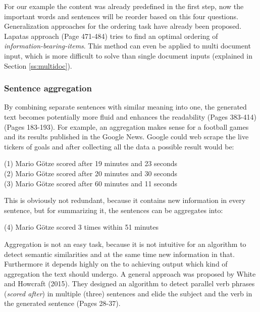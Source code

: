 For our example the content was already predefined in the first step, now the important words and sentences will be reorder based on this four questions. Generalization approaches for the ordering task have already been proposed. Lapatas approach \cite{lapata} (Page 471-484) tries to find an optimal ordering of \textit{information-bearing-items}. This method can even be applied to multi document input, which is more difficult to solve than single document inputs (explained in Section \ref{ss:multidoc}).

\subsubsection{Sentence aggregation}

By combining separate sentences with similar meaning into one, the generated text becomes potentially more fluid and enhances the readability \cite{dal} (Pages 383-414) \cite{cheng-mellish2000} (Pages 183-193). For example, an aggregation makes sense for a football games and its results published in the Google News. Google could web scrape the live tickers of goals and after collecting all the data a possible result would be:

\begin{tcolorbox}
	\begin{center}
		(1) Mario Götze scored after 19 minutes and 23 seconds \\
		(2) Mario Götze scored after 20 minutes and 30 seconds \\
		(3) Mario Götze scored after 60 minutes and 11 seconds
	\end{center}
\end{tcolorbox}

This is obviously not redundant, because it contains new information in every sentence, but for summarizing it, the sentences can be aggregates into:

\begin{tcolorbox}
	\begin{center}
		(4) Mario Götze scored 3 times within 51 minutes
	\end{center}
\end{tcolorbox}

Aggregation is not an easy task, because it is not intuitive for an algorithm to detect semantic similarities and at the same time new information in that. Furthermore it depends highly on the to achieving output which kind of aggregation the text should undergo. A general approach was proposed by White and Howcraft (2015). They designed an algorithm to detect parallel verb phrases (\textit{scored after}) in multiple (three) sentences and elide the subject and the verb in the generated sentence \cite{white-howcroft-2015-inducing} (Pages 28-37). 

